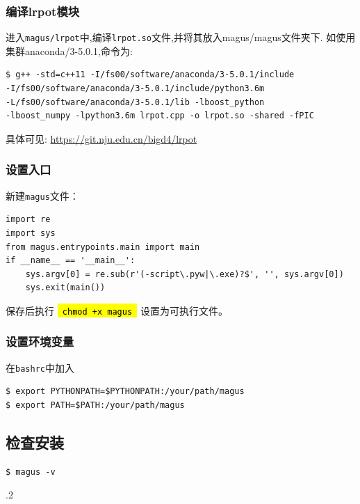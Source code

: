 \documentclass[12pt]{article}
\newcommand{\code}[1]{
  \begingroup
  \sethlcolor{Seashell}
  {\hl{\texttt{~#1~}}}
  \endgroup
}
\newcommand{\file}[1]{\texttt{#1}}
\begin{document}
\subsubsection{编译lrpot模块}
进入\file{magus/lrpot}中,编译\file{lrpot.so}文件,并将其放入magus/magus文件夹下.
如使用集群anaconda/3-5.0.1,命令为:
\begin{tcolorbox}
    \begin{verbatim}
$ g++ -std=c++11 -I/fs00/software/anaconda/3-5.0.1/include 
-I/fs00/software/anaconda/3-5.0.1/include/python3.6m 
-L/fs00/software/anaconda/3-5.0.1/lib -lboost_python 
-lboost_numpy -lpython3.6m lrpot.cpp -o lrpot.so -shared -fPIC
\end{verbatim}
\end{tcolorbox}
具体可见:
\textcolor{blue}{\url{https://git.nju.edu.cn/bigd4/lrpot}}
\subsubsection{设置入口}
新建\file{magus}文件：
\begin{tcolorbox}
    \begin{verbatim}
import re
import sys
from magus.entrypoints.main import main
if __name__ == '__main__':
    sys.argv[0] = re.sub(r'(-script\.pyw|\.exe)?$', '', sys.argv[0])
    sys.exit(main())
    \end{verbatim}
\end{tcolorbox}
保存后执行\code{chmod +x magus}设置为可执行文件。
\subsubsection{设置环境变量}
在\file{bashrc}中加入
\begin{tcolorbox}
    \begin{verbatim}
$ export PYTHONPATH=$PYTHONPATH:/your/path/magus
$ export PATH=$PATH:/your/path/magus
    \end{verbatim}
\end{tcolorbox}

\subsection{检查安装}
\begin{tcolorbox}
    \begin{verbatim}
$ magus -v
    \end{verbatim}
.2
\end{tcolorbox}
\end{document}
